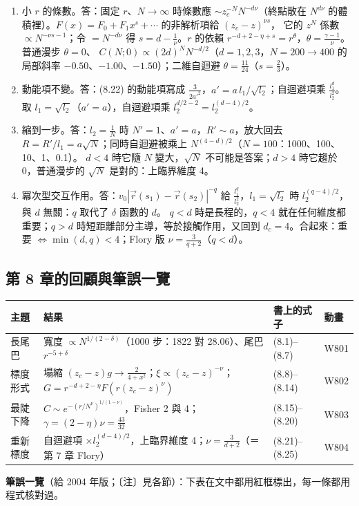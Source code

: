 {\begin{enumerate}[label=\textbf{8.\arabic*},itemsep=0.05em]
普通漫步 $x=2d$、$p=0$；二維自迴避 $x=\mu\approx2.638$、$p=\frac{11}{32}$（$N=1000\to2000$ 的局部斜率 0.3436）；比值法見圖 \ref{eight-fig-sd}。
\item 小 $r$ 的條數。\quad 答：固定 $r$、$N\to\infty$ 時條數應 $\sim z_c^{-N}N^{-d\nu}$（終點散在 $N^{d\nu}$ 的體積裡）。$F(x)=F_0+F_1x^s+\cdots$ 的非解析項給 $(z_c-z)^{\nu s}$，
它的 $z^N$ 係數 $\propto N^{-\nu s-1}$；令 $=N^{-d\nu}$ 得 $s=d-\frac1\nu$。$r$ 的依賴 $r^{-d+2-\eta+s}=r^\theta$，$\theta=\frac{\gamma-1}\nu$。普通漫步 $\theta=0$、
$C(N;0)\propto(2d)^NN^{-d/2}$（$d=1,2,3$，$N=200\to400$ 的局部斜率 $-0.50$、$-1.00$、$-1.50$）；二維自迴避 $\theta=\frac{11}{24}$（$s=\frac23$）。
\item 動能項不變。\quad 答：(8.22) 的動能項寫成 $\frac3{2a'^2}$，$a'=a\,l_1/\sqrt{l_2}$；自迴避項乘 $\frac{l_1^d}{l_2^2}$。取 $l_1=\sqrt{l_2}$（$a'=a$），自迴避項乘 $l_2^{d/2-2}=l_2^{(d-4)/2}$。
\item 縮到一步。\quad 答：$l_2=\frac1N$ 時 $N'=1$、$a'=a$，$R'\sim a$，放大回去 $R=R'/l_1=a\sqrt N$；同時自迴避被乘上 $N^{(4-d)/2}$（$N=100$：1000、100、10、1、0.1）。
$d<4$ 時它隨 $N$ 變大，$\sqrt N$ 不可能是答案；$d>4$ 時它趨於 0，普通漫步的 $\sqrt N$ 是對的：上臨界維度 4。
\item 冪次型交互作用。\quad 答：$v_0|\vec r(s_1)-\vec r(s_2)|^{-q}$ 給 $\frac{l_1^q}{l_2^2}$，$l_1=\sqrt{l_2}$ 時 $l_2^{(q-4)/2}$，與 $d$ 無關：$q$ 取代了 $\delta$ 函數的 $d$。
$q<d$ 時是長程的，$q<4$ 就在任何維度都重要；$q>d$ 時短距離部分主導，等於接觸作用，又回到 $d_c=4$。合起來：重要 $\Leftrightarrow\min(d,q)<4$；Flory 版 $\nu=\frac3{q+2}$（$q<d$）。
\end{enumerate}}

\subsection{第 8 章的回顧與筆誤一覽}
\begin{center}
\small\setlength{\tabcolsep}{4pt}
\begin{tabular}{@{}llll@{}}
\toprule
主題 & 結果 & 書上的式子 & 動畫\\
\midrule
長尾巴 & 寬度 $\propto N^{1/(2-\delta)}$（1000 步：1822 對 28.06）、尾巴 $r^{-5+\delta}$ & (8.1)--(8.7) & W801\\
標度形式 & 塌縮 $(z_c-z)g\to\frac2{4+x^2}$；$\xi\propto(z_c-z)^{-\nu}$；$G=r^{-d+2-\eta}F(r(z_c-z)^\nu)$ & (8.8)--(8.14) & W802\\
最陡下降 & $C\sim e^{-(r/N^\nu)^{1/(1-\nu)}}$，Fisher 2 與 4；$\gamma=(2-\eta)\nu=\frac{43}{32}$ & (8.15)--(8.20) & W803\\
重新標度 & 自迴避項 $\times l_2^{(d-4)/2}$，上臨界維度 4；$\nu=\frac3{d+2}$（＝第 7 章 Flory） & (8.21)--(8.25) & W804\\
\bottomrule
\end{tabular}
\end{center}
\textbf{筆誤一覽}（給 2004 年版；〔注〕見各節）：下表在文中都用紅框標出，每一條都用程式核對過。
\begin{center}
\footnotesize\renewcommand{\arraystretch}{0.9}
\EightTabErrata
\end{center}
